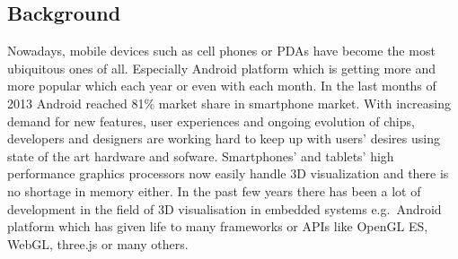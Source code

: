 
\subsection{Background}
Nowadays, mobile devices such as cell phones or PDAs have become the most ubiquitous ones of all.
Especially Android platform which is getting more and more popular which each year or even with each month.
In the last months of 2013 Android reached 81\% market share in smartphone market.
With increasing demand for new features, user experiences and ongoing evolution of chips,  developers and designers are working hard to keep up with users' desires using state of the art hardware and sofware.
Smartphones’ and tablets’ high performance graphics processors now easily handle 3D visualization and there is no shortage in memory either.
In the past few years there has been a lot of development in the field of 3D visualisation in embedded systems e.g.\ Android platform which has given life to many frameworks or APIs like OpenGL ES, WebGL, three.js or many others.

